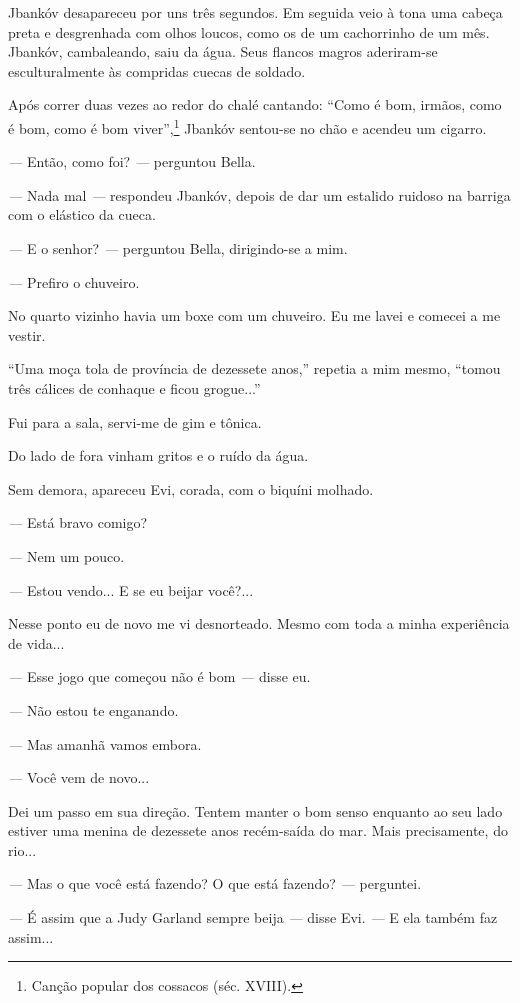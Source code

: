Jbankóv desapareceu por uns três segundos. Em seguida veio à tona uma
cabeça preta e desgrenhada com olhos loucos, como os de um cachorrinho
de um mês. Jbankóv, cambaleando, saiu da água. Seus flancos magros
aderiram-se esculturalmente às compridas cuecas de soldado.

Após correr duas vezes ao redor do chalé cantando: ``Como é bom, irmãos,
como é bom, como é bom viver'',\footnote{Canção popular dos cossacos
  (séc. XVIII).} Jbankóv sentou-se no chão e acendeu um cigarro.

\emph{---} Então, como foi? \emph{---} perguntou Bella.

\emph{---} Nada mal \emph{---} respondeu Jbankóv, depois de dar um
estalido ruidoso na barriga com o elástico da cueca.

\emph{---} E o senhor? \emph{---} perguntou Bella, dirigindo-se a mim.

\emph{---} Prefiro o chuveiro.

No quarto vizinho havia um boxe com um chuveiro. Eu me lavei e comecei a
me vestir.

``Uma moça tola de província de dezessete anos,'' repetia a mim mesmo,
``tomou três cálices de conhaque e ficou grogue...''

Fui para a sala, servi-me de gim e tônica.

Do lado de fora vinham gritos e o ruído da água.

Sem demora, apareceu Evi, corada, com o biquíni molhado.

\emph{---} Está bravo comigo?

\emph{---} Nem um pouco.

\emph{---} Estou vendo... E se eu beijar você?...

Nesse ponto eu de novo me vi desnorteado. Mesmo com toda a minha
experiência de vida...

\emph{---} Esse jogo que começou não é bom \emph{---} disse eu.

\emph{---} Não estou te enganando.

\emph{---} Mas amanhã vamos embora.

\emph{---} Você vem de novo...

Dei um passo em sua direção. Tentem manter o bom senso enquanto ao seu
lado estiver uma menina de dezessete anos recém-saída do mar. Mais
precisamente, do rio...

\emph{---} Mas o que você está fazendo? O que está fazendo? \emph{---}
perguntei.

\emph{---} É assim que a Judy Garland sempre beija \emph{---} disse Evi.
\emph{---} E ela também faz assim...


